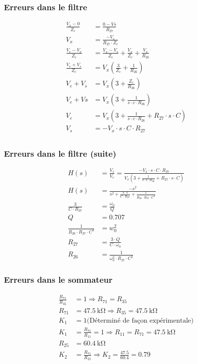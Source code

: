 \documentclass[10pt]{beamer}\usepackage[]{graphicx}\usepackage[]{xcolor}
\begin{document}

\begin{frame}
\frametitle{Erreurs dans le filtre}
\footnotesize
\begin{align}
  \frac{V_{x}-0}{Z_{c}}&=\frac{0-V s}{R_{27}} \\
  V_{x}&=\frac{-V_{s}}{R_{27} \cdot Z_{c}} \\
  \frac{V_{e}-V_{x}}{Z_{c}}&=\frac{V_{x}-V_{s}}{Z_{c}}+\frac{V_{x}}{Z_{c}}+\frac{V_{x}}{R_{26}} \\
  \frac{V_{e}+V_{s}}{Z_{c}}&=V_{x}\left(\frac{3}{Z_{c}}+\frac{1}{R_{26}}\right) \\
  V_{e}+V_{s}&=V_{x}\left(3+\frac{Z_{c}}{R_{26}}\right) \\
  V_{e}+V s&=V_{x}\left(3+\frac{1}{s \cdot c \cdot R_{26}}\right) \\
  V_{e}&=V_{x}\left(3+\frac{1}{s \cdot c \cdot R_{26}}+R_{27} \cdot s \cdot C\right) \\
  V_{s}&=-V_{x} \cdot s \cdot C \cdot R_{27} \\
\end{align}
\end{frame}

\begin{frame}
\frametitle{Erreurs dans le filtre (suite)}
\begin{align}
  H(s)&=\frac{V_{s}}{V_{e}}=\frac{-V_{x} \cdot s \cdot C \cdot R_{27}}{V_{x}\left(3+\frac{1}{s \cdot c \cdot R_{26}}+R_{27} \cdot s \cdot C\right)} \\
  H(s)&=\frac{-s^{2}}{s^{2}+\frac{3 \cdot s}{C \cdot R_{27}}+\frac{1}{R_{26} \cdot R_{27} \cdot C^{2}}} \\
  \frac{3}{C \cdot R_{27}}&=\frac{\omega_{0}}{Q} \\
  Q&=0.707 \\
  \frac{1}{R_{26} \cdot R_{27} \cdot C^{2}}&=w_{0}^{2} \\
  R_{27}&=\frac{3 \cdot Q}{C \cdot \omega_{0}} \\
  R_{26}&=\frac{1}{\omega_{0}^{2} \cdot R_{27} \cdot C^{2}}
\end{align}
\end{frame}

\begin{frame}
\frametitle{Erreurs dans le sommateur}
\begin{align}
  \frac{ R_{71} }{R_{35}} &= 1  \Rightarrow R_{71} = R_{35} \\
  R_{71} &= \SI{47.5}{\kilo\ohm} \Rightarrow R_{35} = \SI{47.5}{\kilo\ohm} \\
  K_1 &= 1 \textrm{(Déterminé de façon expérimentale)} \\
  K_1 &= \frac{R_{71}}{R_{11}} = 1 \Rightarrow R_{11} = R_{71} = \SI{47.5}{\kilo\ohm} \\
  R_{25} &= \SI{60.4}{\kilo\ohm} \\
  K_2 &= \frac{R_{71}}{R_{25}} \Rightarrow K_2 = \frac{47.5}{60.4} = 0.79 \\
\end{align}
\end{frame}
\end{document}
